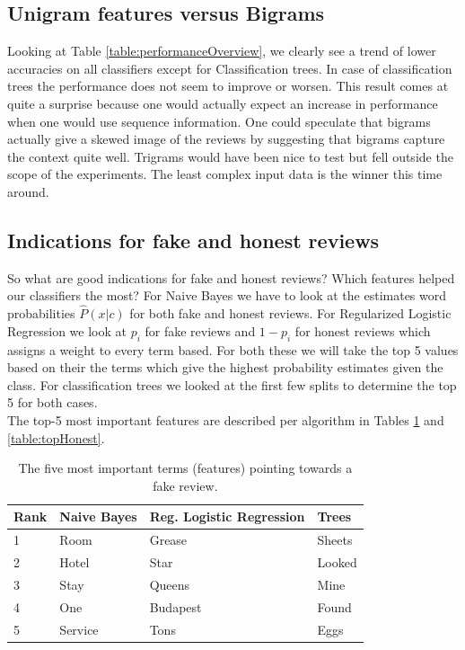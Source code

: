 \documentclass[a4paper,11pt]{article}
\begin{document}
\subsection{Unigram features versus Bigrams}
Looking at Table \ref{table:performanceOverview}, we clearly see a trend of lower accuracies on all classifiers except for Classification trees. In case of classification trees the performance does not seem to improve or worsen. This result comes at quite a surprise because one would actually expect an increase in performance when one would use sequence information. One could speculate that bigrams actually give a skewed image of the reviews by suggesting that bigrams capture the context quite well. Trigrams would have been nice to test but fell outside the scope of the experiments. The least complex input data is the winner this time around. 

\subsection{Indications for fake and honest reviews}
So what are good indications for fake and honest reviews? Which features helped our classifiers the most? For Naive Bayes we have to look at the estimates word probabilities $\hat{P}(x|c)$ for both fake and honest reviews. For Regularized Logistic Regression we look at $p_i$ for fake reviews and $1-p_i$ for honest reviews which assigns a weight to every term based. For both these we will take the top 5 values based on their the terms which give the highest probability estimates given the class. For classification trees we looked at the first few splits to determine the top 5 for both cases. \\
The top-5 most important features are described per algorithm in Tables \ref{table:topFake} and \ref{table:topHonest}. 

\begin{table}[H]
\centering
\caption{The five most important terms (features) pointing towards a fake review.}
\label{table:topFake}
\begin{tabular}{|l|l|l|l|}
\hline
Rank & Naive Bayes & Reg. Logistic Regression & Trees \\
\hline
1 & Room      &  Grease  & Sheets\\
2 & Hotel     &  Star  & Looked \\
3 & Stay      &  Queens  & Mine \\
4 & One       &  Budapest  & Found\\
5 & Service   &  Tons  & Eggs \\
\hline
\end{tabular}
\end{table}
\end{document}
